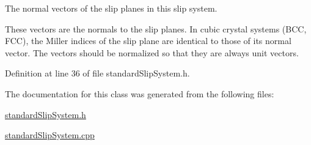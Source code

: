 \-The normal vectors of the slip planes in this slip system. 

\-These vectors are the normals to the slip planes. \-In cubic crystal systems (\-B\-C\-C, \-F\-C\-C), the \-Miller indices of the slip plane are identical to those of its normal vector. \-The vectors should be normalized so that they are always unit vectors. 

\-Definition at line 36 of file standard\-Slip\-System.\-h.



\-The documentation for this class was generated from the following files\-:\begin{DoxyCompactItemize}
\item 
\hyperlink{standardSlipSystem_8h}{standard\-Slip\-System.\-h}\item 
\hyperlink{standardSlipSystem_8cpp}{standard\-Slip\-System.\-cpp}\end{DoxyCompactItemize}
